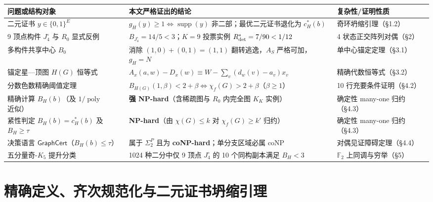 \documentclass[11pt,a4paper]{ctexart}
\theoremstyle{definition}
\newcommand{\GraphCert}{\mathsf{GraphCert}}
\newcommand{\FF}{\mathbb F}
\newcommand{\1}{\boldsymbol 1}
\newcommand{\0}{\boldsymbol 0}
\newcommand{\chif}{\chi_f}
\begin{document}
\vspace{2mm}
\begin{center}
\small
\begin{tabularx}{\linewidth}{@{}p{.31\linewidth}X p{.22\linewidth}@{}}
\toprule
问题或结构对象 & 本文严格证出的结论 & 复杂性/证明性质 \\
\midrule
二元证书 $y\in\{0,1\}^E$ & $g_H(y)\ge 1\iff \operatorname{supp}(y)$ 非二部；最优二元证书退化为 $c_H^*(b)$ & 奇环坍缩引理（§1.2） \\
9 顶点构件 $J_4^\circ$ 与 $R_0$ 显式反例 & $\boxed{B_{J_4^\circ}=14/5<3}$；$K=9$ 投票实例 $R_{\rm det}^*=7/90<1/12$ & 4 状态正交阵列对偶（§2） \\
多构件共享中心 $B_0$ & 消除 $(1,0)+(0,1)=(1,1)$ 翻转逃逸，$A_S$ 严格可加，$g_H=N$ & 单中心锚定定理（§3.1） \\
锚定星—顶图 $H(G)$ 恒等式 & $A_x(a,w)-D_x(w)\equiv W-\sum_{v}(d_w(v)-a_v)x_v$ & 精确代数恒等式（§3.2） \\
分数色数精确阈值定理 & $\boxed{B_{H(G)}(1,\beta)<2+\beta \iff \chif(G)>2+\beta}$（$\beta\ge 1$） & 10 行充要条件证明（§4.2） \\
精确计算 $B_H(b)$（及 $1/\operatorname{poly}$ 近似） & \textbf{强 NP-hard}（含稀疏图与 $R_0$ 内完全图 $K_K$ 实例） & 确定性 many-one 归约（§4.3） \\
紧性判定 $B_H(b)=c_H^*(b)$ 及 $B_H\ge\tau$ & \textbf{NP-hard}（由 $\chi(G)\le k$ 对 $\chif(G)\ge k'$ 归约） & 确定性 many-one 归约（§4.3） \\
决策语言 $\GraphCert$（$B_H(b)\le\tau$） & 属于 $\Sigma_2^P$ 且为 \textbf{coNP-hard}；单分支区域必属 $\mathrm{coNP}$ & 对偶见证障碍定理（§4.4） \\
五分量奇-$K_5$ 提升分类 & 1024 种二分中仅 9 顶点 $J_4^\circ$ 的 10 个同构副本满足 $B_H<3$ & $\FF_2$ 上同调与穷举（§5） \\
\bottomrule
\end{tabularx}
\end{center}

\newpage
\tableofcontents
\newpage

\section{精确定义、齐次规范化与二元证书坍缩引理}
\end{document}

